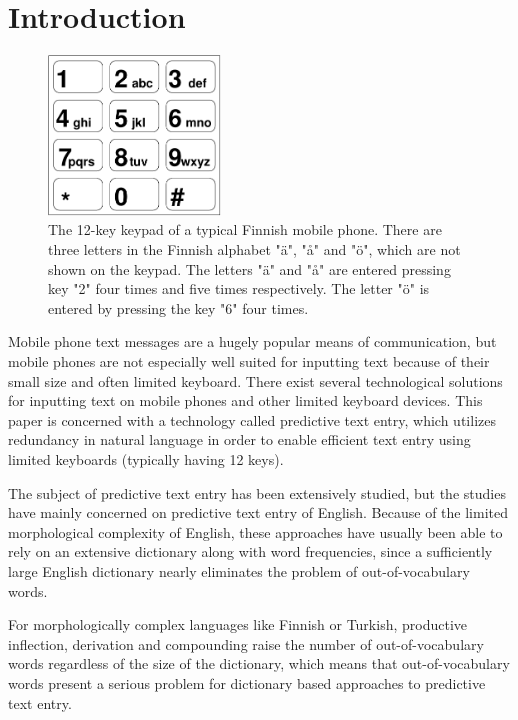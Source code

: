 \documentclass{llncs}
\begin{document}
\section{Introduction}

\begin{figure}[hbt!]
\begin{center}
\includegraphics[width=1.8in]{finnish_mobile_phone_keypad.pdf}
\caption{The 12-key keypad of a typical Finnish mobile phone. There are three letters in the Finnish alphabet "\"{a}", "å" and "\"{o}", which are not shown on the keypad. The
  letters "\"{a}" and "å" are entered pressing key "2" four times and
  five times respectively. The letter "\"{o}" is entered by pressing
  the key "6" four times.}\label{keypad}
\end{center}
\end{figure}

Mobile phone text messages are a hugely popular means of
communication, but mobile phones are not especially well suited for
inputting text because of their small size and often limited
keyboard. There exist several technological solutions for inputting text
on mobile phones and other limited keyboard devices. This paper is
concerned with a technology called predictive text entry, which
utilizes redundancy in natural language in order to enable efficient
text entry using limited keyboards (typically having 12 keys).



The subject of predictive text entry has been extensively studied, but
the studies have mainly concerned on predictive text entry of
English. Because of the limited morphological complexity of English,
these approaches have usually been able to rely on an extensive
dictionary along with word frequencies, since a sufficiently large
English dictionary nearly eliminates the problem of out-of-vocabulary
words. 

For morphologically complex languages like Finnish or Turkish,
productive inflection, derivation and compounding raise the number of
out-of-vocabulary words regardless of the size of the dictionary,
which means that out-of-vocabulary words present a serious problem for
dictionary based approaches to predictive text entry.
\end{document}
